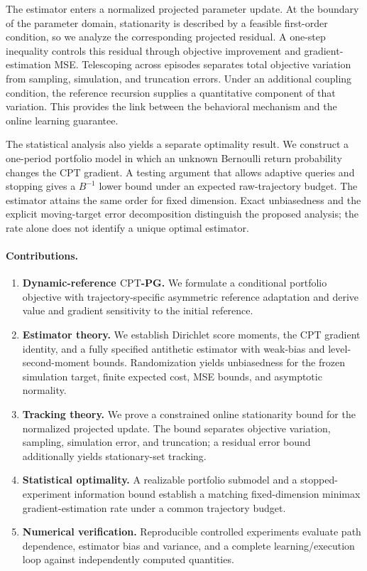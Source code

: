 \documentclass[11pt]{article}
\newcommand{\1}{\mathbf 1}
\newcommand{\CPT}{\ensuremath{\mathrm{CPT}}\xspace}
\begin{document}
The estimator enters a normalized projected parameter update. At the boundary of the parameter domain, stationarity is described by a feasible first-order condition, so we analyze the corresponding projected residual. A one-step inequality controls this residual through objective improvement and gradient-estimation MSE. Telescoping across episodes separates total objective variation from sampling, simulation, and truncation errors. Under an additional coupling condition, the reference recursion supplies a quantitative component of that variation. This provides the link between the behavioral mechanism and the online learning guarantee.

The statistical analysis also yields a separate optimality result. We construct a one-period portfolio model in which an unknown Bernoulli return probability changes the \CPT gradient. A testing argument that allows adaptive queries and stopping gives a $B^{-1}$ lower bound under an expected raw-trajectory budget. The estimator attains the same order for fixed dimension. Exact unbiasedness and the explicit moving-target error decomposition distinguish the proposed analysis; the rate alone does not identify a unique optimal estimator.

\paragraph{Contributions.}
\begin{enumerate}[leftmargin=2em]
\item \textbf{Dynamic-reference \CPT-PG.} We formulate a conditional portfolio objective with trajectory-specific asymmetric reference adaptation and derive value and gradient sensitivity to the initial reference.
\item \textbf{Estimator theory.} We establish Dirichlet score moments, the \CPT gradient identity, and a fully specified antithetic estimator with weak-bias and level-second-moment bounds. Randomization yields unbiasedness for the frozen simulation target, finite expected cost, MSE bounds, and asymptotic normality.
\item \textbf{Tracking theory.} We prove a constrained online stationarity bound for the normalized projected update. The bound separates objective variation, sampling, simulation error, and truncation; a residual error bound additionally yields stationary-set tracking.
\item \textbf{Statistical optimality.} A realizable portfolio submodel and a stopped-experiment information bound establish a matching fixed-dimension minimax gradient-estimation rate under a common trajectory budget.
\item \textbf{Numerical verification.} Reproducible controlled experiments evaluate path dependence, estimator bias and variance, and a complete learning/execution loop against independently computed quantities.
\end{enumerate}
\end{document}
